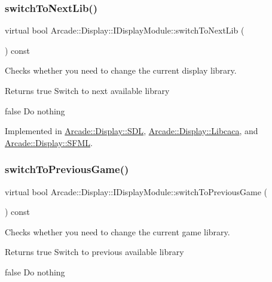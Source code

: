 \subsubsection{\texorpdfstring{switchToNextLib()}{switchToNextLib()}}
{\footnotesize\ttfamily virtual bool Arcade\+::\+Display\+::\+I\+Display\+Module\+::switch\+To\+Next\+Lib (\begin{DoxyParamCaption}{ }\end{DoxyParamCaption}) const\hspace{0.3cm}{\ttfamily [pure virtual]}}



Checks whether you need to change the current display library. 

\begin{DoxyReturn}{Returns}
true Switch to next available library 

false Do nothing 
\end{DoxyReturn}


Implemented in \mbox{\hyperlink{classArcade_1_1Display_1_1SDL_a91bee5a87dfcacb4da9d6d148dc52a2b}{Arcade\+::\+Display\+::\+S\+DL}}, \mbox{\hyperlink{classArcade_1_1Display_1_1Libcaca_ada47921d3d90780e6817bddd1efcd017}{Arcade\+::\+Display\+::\+Libcaca}}, and \mbox{\hyperlink{classArcade_1_1Display_1_1SFML_a3e7d385aaa46e9137f41e4d78d5e233c}{Arcade\+::\+Display\+::\+S\+F\+ML}}.

\mbox{\label{classArcade_1_1Display_1_1IDisplayModule_a3bbbfe00907c8f3e4c7ef1aadedcc513}} 
\subsubsection{\texorpdfstring{switchToPreviousGame()}{switchToPreviousGame()}}
{\footnotesize\ttfamily virtual bool Arcade\+::\+Display\+::\+I\+Display\+Module\+::switch\+To\+Previous\+Game (\begin{DoxyParamCaption}{ }\end{DoxyParamCaption}) const\hspace{0.3cm}{\ttfamily [pure virtual]}}



Checks whether you need to change the current game library. 

\begin{DoxyReturn}{Returns}
true Switch to previous available library 

false Do nothing 
\end{DoxyReturn}


